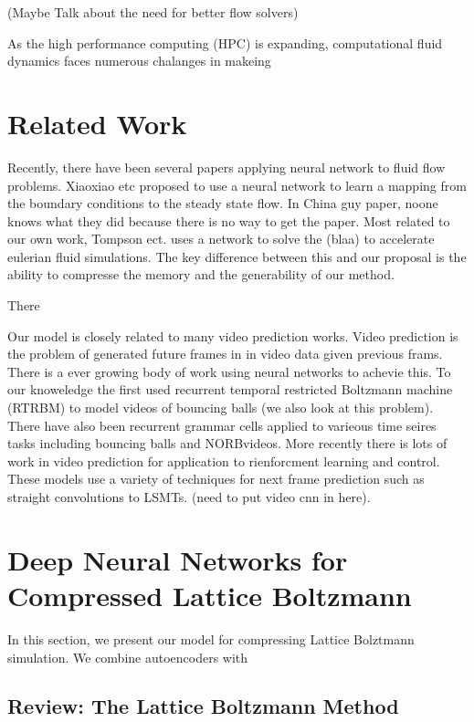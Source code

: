 \documentclass{article}
\begin{document}
(Maybe Talk about the need for better flow solvers)

As the high performance computing (HPC) is expanding, computational fluid dynamics faces numerous chalanges in makeing 


\section{Related Work}

Recently, there have been several papers applying neural network to fluid flow problems. Xiaoxiao etc \cite{guo2016convolutional} proposed to use a neural network to learn a mapping from the boundary conditions to the steady state flow. In China guy paper, noone knows what they did because there is no way to get the paper. Most related to our own work, Tompson ect. \cite{tompson2016accelerating} uses a network to solve the (blaa) to accelerate eulerian fluid simulations. The key difference between this and our proposal is the ability to compresse the memory and the generability of our method.

There

Our model is closely related to many video prediction works. Video prediction is the problem of generated future frames in in video data given previous frams. There is a ever growing body of work using neural networks to achevie this. To our knoweledge the first used recurrent temporal restricted Boltzmann machine (RTRBM) to model videos of bouncing balls (we also look at this problem). There have also been recurrent grammar cells applied to varieous time seires tasks including bouncing balls and NORBvideos. More recently there is lots of work in video prediction for application to rienforcment learning and control. These models use a variety of techniques for next frame prediction such as straight convolutions  to LSMTs. (need to put video cnn in here).


\section{Deep Neural Networks for Compressed Lattice Boltzmann}

In this section, we present our model for compressing Lattice Bolztmann simulation. We combine autoencoders with

\subsection{Review: The Lattice Boltzmann Method}
\end{document}
